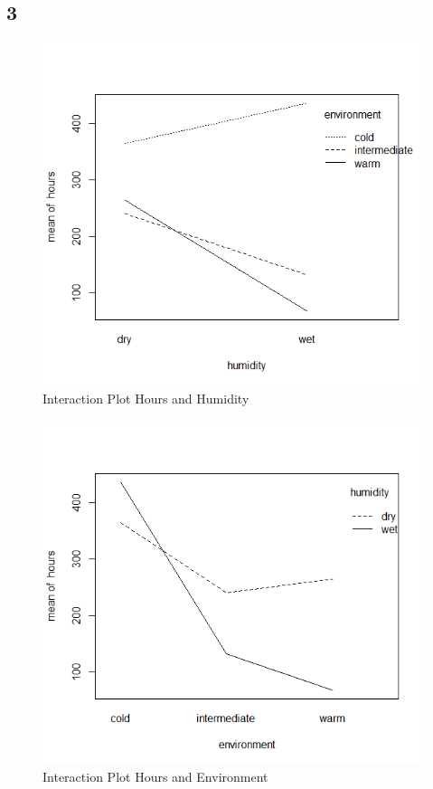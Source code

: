 \documentclass{article}
\begin{document}
    \subsection*{3}
      \begin{figure}
        \includegraphics[scale=0.6]{../results/IntPlotHoursHum.png}
        \caption{Interaction Plot Hours and Humidity}
        \label{fig:IntPlotHoursHum}
      \end{figure}
      \begin{figure}
        \includegraphics[scale=0.6]{../results/IntPlotHoursEnv.png}
        \caption{Interaction Plot Hours and Environment}
        \label{fig:IntPlotHoursHum}
      \end{figure}
    
\end{document}
